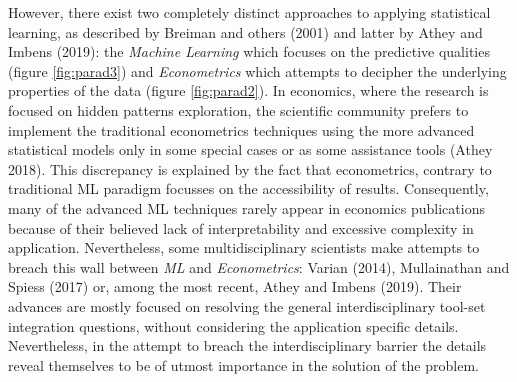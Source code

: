 \documentclass[12pt,]{article}
\begin{document}
However, there exist two completely distinct approaches to applying
statistical learning, as described by Breiman and others (2001) and
latter by Athey and Imbens (2019): the \emph{Machine Learning} which
focuses on the predictive qualities (figure \ref{fig:parad3}) and
\emph{Econometrics} which attempts to decipher the underlying properties
of the data (figure \ref{fig:parad2}). In economics, where the research
is focused on hidden patterns exploration, the scientific community
prefers to implement the traditional econometrics techniques using the
more advanced statistical models only in some special cases or as some
assistance tools (Athey 2018). This discrepancy is explained by the fact
that econometrics, contrary to traditional ML paradigm focusses on the
accessibility of results. Consequently, many of the advanced ML
techniques rarely appear in economics publications because of their
believed lack of interpretability and excessive complexity in
application. Nevertheless, some multidisciplinary scientists make
attempts to breach this wall between \emph{ML} and \emph{Econometrics}:
Varian (2014), Mullainathan and Spiess (2017) or, among the most recent,
Athey and Imbens (2019). Their advances are mostly focused on resolving
the general interdisciplinary tool-set integration questions, without
considering the application specific details. Nevertheless, in the
attempt to breach the interdisciplinary barrier the details reveal
themselves to be of utmost importance in the solution of the problem.
\end{document}
